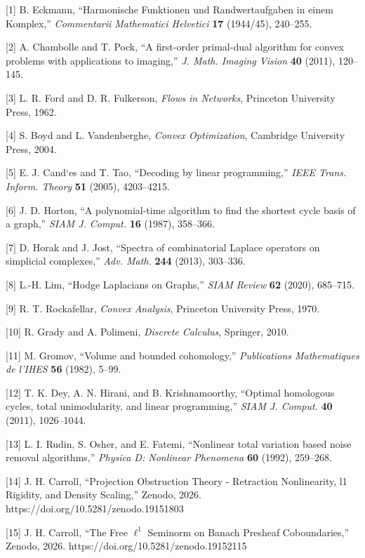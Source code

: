 \documentclass[
]{article}
\begin{document}
{[}1{]} B. Eckmann, ``Harmonische Funktionen und Randwertaufgaben in
einem Komplex,'' \emph{Commentarii Mathematici Helvetici} \textbf{17}
(1944/45), 240--255.

{[}2{]} A. Chambolle and T. Pock, ``A first-order primal-dual algorithm
for convex problems with applications to imaging,'' \emph{J. Math.
Imaging Vision} \textbf{40} (2011), 120--145.

{[}3{]} L. R. Ford and D. R. Fulkerson, \emph{Flows in Networks},
Princeton University Press, 1962.

{[}4{]} S. Boyd and L. Vandenberghe, \emph{Convex Optimization},
Cambridge University Press, 2004.

{[}5{]} E. J. Cand`es and T. Tao, ``Decoding by linear programming,''
\emph{IEEE Trans. Inform. Theory} \textbf{51} (2005), 4203--4215.

{[}6{]} J. D. Horton, ``A polynomial-time algorithm to find the shortest
cycle basis of a graph,'' \emph{SIAM J. Comput.} \textbf{16} (1987),
358--366.

{[}7{]} D. Horak and J. Jost, ``Spectra of combinatorial Laplace
operators on simplicial complexes,'' \emph{Adv. Math.} \textbf{244}
(2013), 303--336.

{[}8{]} L.-H. Lim, ``Hodge Laplacians on Graphs,'' \emph{SIAM Review}
\textbf{62} (2020), 685--715.

{[}9{]} R. T. Rockafellar, \emph{Convex Analysis}, Princeton University
Press, 1970.

{[}10{]} R. Grady and A. Polimeni, \emph{Discrete Calculus}, Springer,
2010.

{[}11{]} M. Gromov, ``Volume and bounded cohomology,''
\emph{Publications Math\textquotesingle ematiques de
l'IH\textquotesingle ES} \textbf{56} (1982), 5--99.

{[}12{]} T. K. Dey, A. N. Hirani, and B. Krishnamoorthy, ``Optimal
homologous cycles, total unimodularity, and linear programming,''
\emph{SIAM J. Comput.} \textbf{40} (2011), 1026--1044.

{[}13{]} L. I. Rudin, S. Osher, and E. Fatemi, ``Nonlinear total
variation based noise removal algorithms,'' \emph{Physica D: Nonlinear
Phenomena} \textbf{60} (1992), 259--268.

{[}14{]} J. H. Carroll, ``Projection Obstruction Theory - Retraction
Nonlinearity, l1 Rigidity, and Density Scaling,'' Zenodo, 2026.
https://doi.org/10.5281/zenodo.19151803

{[}15{]} J. H. Carroll, ``The Free \(\ell^1\) Seminorm on Banach
Presheaf Coboundaries,'' Zenodo, 2026.
https://doi.org/10.5281/zenodo.19152115
\end{document}

